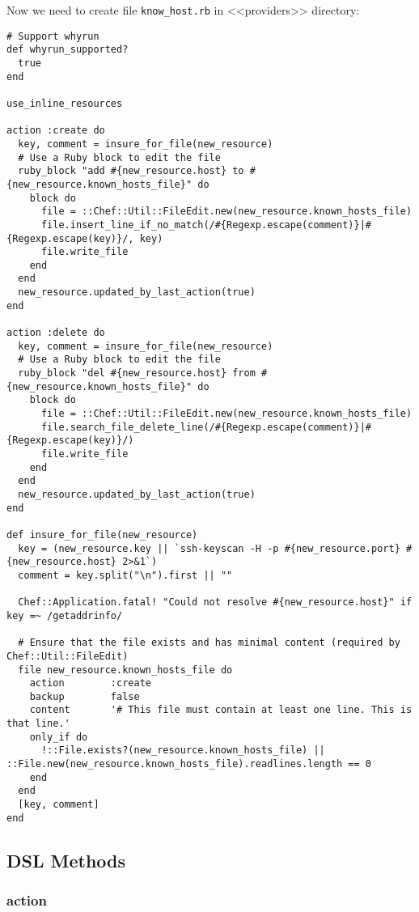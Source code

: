 Now we need to create file \lstinline!know_host.rb! in <<providers>> directory:

\begin{lstlisting}[label=lst:cookbook-lwrp4,title=my-server-cloud/site-cookbooks/my\_cool\_app/providers/know\_host.rb]
# Support whyrun
def whyrun_supported?
  true
end

use_inline_resources

action :create do
  key, comment = insure_for_file(new_resource)
  # Use a Ruby block to edit the file
  ruby_block "add #{new_resource.host} to #{new_resource.known_hosts_file}" do
    block do
      file = ::Chef::Util::FileEdit.new(new_resource.known_hosts_file)
      file.insert_line_if_no_match(/#{Regexp.escape(comment)}|#{Regexp.escape(key)}/, key)
      file.write_file
    end
  end
  new_resource.updated_by_last_action(true)
end

action :delete do
  key, comment = insure_for_file(new_resource)
  # Use a Ruby block to edit the file
  ruby_block "del #{new_resource.host} from #{new_resource.known_hosts_file}" do
    block do
      file = ::Chef::Util::FileEdit.new(new_resource.known_hosts_file)
      file.search_file_delete_line(/#{Regexp.escape(comment)}|#{Regexp.escape(key)}/)
      file.write_file
    end
  end
  new_resource.updated_by_last_action(true)
end

def insure_for_file(new_resource)
  key = (new_resource.key || `ssh-keyscan -H -p #{new_resource.port} #{new_resource.host} 2>&1`)
  comment = key.split("\n").first || ""

  Chef::Application.fatal! "Could not resolve #{new_resource.host}" if key =~ /getaddrinfo/

  # Ensure that the file exists and has minimal content (required by Chef::Util::FileEdit)
  file new_resource.known_hosts_file do
    action        :create
    backup        false
    content       '# This file must contain at least one line. This is that line.'
    only_if do
      !::File.exists?(new_resource.known_hosts_file) || ::File.new(new_resource.known_hosts_file).readlines.length == 0
    end
  end
  [key, comment]
end
\end{lstlisting}

\subsection{DSL Methods}

\subsubsection{action}

